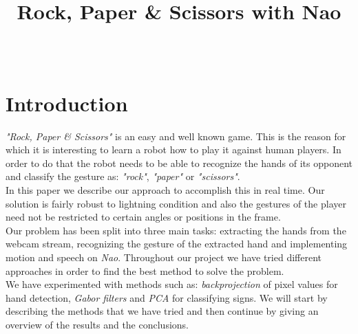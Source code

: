\documentclass[a4paper, 11pt, twocolumn]{article}
\date{} %
\author{\fade{Nimrod Raiman [0336696]}\\\fade{Silvia L. Pintea [6109960]}}
\title{Rock, Paper \& Scissors with Nao}
\begin{document}
    \maketitle
    \section{Introduction}
	\label{sec:intro}
        \emph{"Rock, Paper \& Scissors"} is an easy and well known game. This is the reason for which it is interesting to learn a robot how to play it against human players. In order to do that the robot needs to be able to recognize the hands of its opponent and classify the gesture as: \emph{"rock"}, \emph{"paper"} or \emph{"scissors"}.\\	
		\hspace*{10px}In this paper we describe our approach to accomplish this in real time. Our solution is fairly robust to lightning condition and also the gestures of the player need not be restricted to certain angles or positions in the frame.\\ 
        \hspace*{10px}Our problem has been split into three main tasks: extracting the hands from the webcam stream, recognizing the gesture of the extracted hand and implementing motion and speech on \emph{Nao}. Throughout our project we have tried different approaches in order to find the best method to solve the problem.\\
		 \hspace*{10px}We have experimented with methods such as: \emph{backprojection} of pixel values for hand detection, \emph{Gabor filters} and \emph{PCA} for classifying signs. We will start by describing the methods that we have tried and then continue by giving an overview of the results and the conclusions.   
\end{document}
